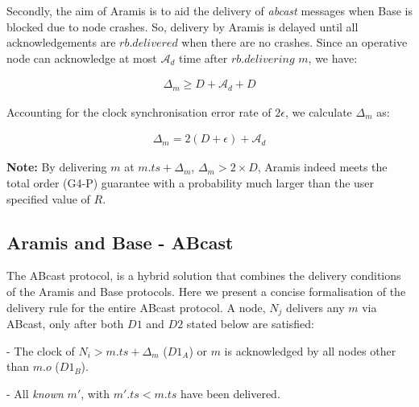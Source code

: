         Secondly, the aim of \textsf{Aramis} is to aid the delivery of \emph{abcast} messages when \textsf{Base} is blocked due to node crashes.  So, delivery by \textsf{Aramis} is delayed until all acknowledgements are $rb.delivered$ when there are no crashes.  Since an operative node can acknowledge at most $\mathcal{A}_d$ time after $rb.delivering$ $m$, we have:
        
        \begin{equation}
            \begin{aligned}
                \Delta_m \geq D + \mathcal{A}_d + D
            \end{aligned}
        \end{equation}
        
        Accounting for the clock synchronisation error rate of $2\epsilon$, we calculate $\Delta_m$ as:
        
        \begin{equation}
            \begin{aligned}
                \Delta_m = 2(D + \epsilon) +  \mathcal{A}_d
            \end{aligned}
        \end{equation}
        
        \textbf{Note:} By delivering $m$ at $m.ts + \Delta_m$, $\Delta_m > 2 \times D$, \textsf{Aramis} indeed meets the total order (G4-P) guarantee with a probability much larger than the user specified value of $R$. 
                
        \subsection{Aramis and Base - \textsf{ABcast}}
        The \textsf{ABcast} protocol, is a hybrid solution that combines the delivery conditions of the \textsf{Aramis} and \textsf{Base} protocols.  Here we present a concise formalisation of the delivery rule for the entire \textsf{ABcast} protocol.  A node, $N_j$ delivers any $m$ via \textsf{ABcast}, only after both $D1$ and $D2$ stated below are satisfied:
	    \begin{description}[labelindent=1cm]
	        \item[$\boldsymbol{D1}$] - The clock of $N_i > m.ts + \Delta_{m}$ ($D1_A$) or $m$ is acknowledged by all nodes other than $m.o$ ($D1_B$). 
	        
	        \item[$\boldsymbol{D2}$] - All \emph{known} $m'$, with $m'.ts < m.ts$ have been delivered.
	    \end{description}
	    
